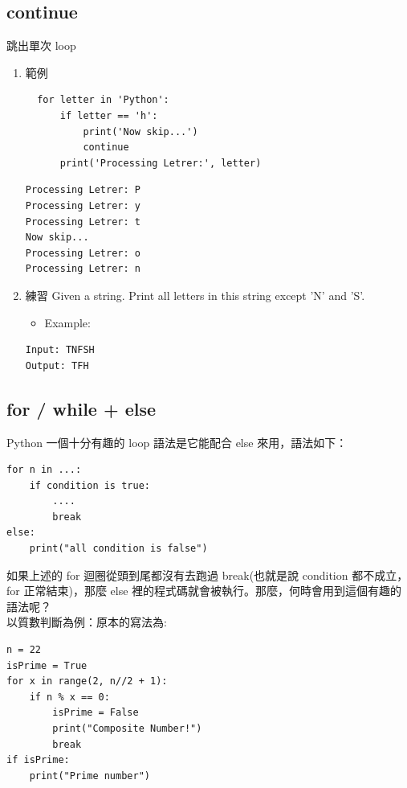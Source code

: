\documentclass[a4paper,12pt]{article}
\begin{document}
\subsection{continue}
\label{sec:org4d63a17}
跳出單次 loop\\
\begin{enumerate}
\item 範例
\label{sec:orgf56bccb}
\lstset{breaklines=true,language=Python,label= ,caption= ,captionpos=b,firstnumber=1,numbers=left}
\begin{lstlisting}
  for letter in 'Python':
      if letter == 'h':
          print('Now skip...')
          continue
      print('Processing Letrer:', letter)
\end{lstlisting}

\begin{verbatim}
Processing Letrer: P
Processing Letrer: y
Processing Letrer: t
Now skip...
Processing Letrer: o
Processing Letrer: n
\end{verbatim}
\item 練習
\label{sec:orgb8a5ec9}
Given a string. Print all letters in this string except 'N' and 'S'.\\
\begin{itemize}
\item Example:\\
\end{itemize}
\begin{verbatim}
Input: TNFSH
Output: TFH
\end{verbatim}
\end{enumerate}

\subsection{for / while + else}
\label{sec:orgdd21f76}
Python 一個十分有趣的 loop 語法是它能配合 else 來用，語法如下：\\
\lstset{breaklines=true,language=Python,label= ,caption= ,captionpos=b,firstnumber=1,numbers=left}
\begin{lstlisting}
for n in ...:
    if condition is true:
        ....
        break
else:
    print("all condition is false")
\end{lstlisting}
如果上述的 for 迴圈從頭到尾都沒有去跑過 break(也就是說 condition 都不成立，for 正常結束)，那麼 else 裡的程式碼就會被執行。那麼，何時會用到這個有趣的語法呢？\\

以質數判斷為例：原本的寫法為:\\
\lstset{breaklines=true,language=Python,label= ,caption= ,captionpos=b,firstnumber=1,numbers=left}
\begin{lstlisting}
n = 22
isPrime = True
for x in range(2, n//2 + 1):
    if n % x == 0:
        isPrime = False
        print("Composite Number!")
        break
if isPrime:
    print("Prime number")
\end{lstlisting}
\end{document}
